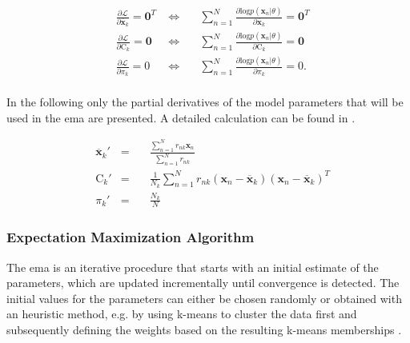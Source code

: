 \documentclass[../../../main.tex]{subfiles}
\begin{document}
\begin{equation*}
    \begin{aligned}
    &\frac{\partial{\mathcal{L}}}{\partial{\overline{\bm{x}}_k}} = \bm{0}^T \; &\Longleftrightarrow \quad &\sum\limits_{n=1}^N\frac{\partial{\mathrm{log}p(\bm{x}_n| \theta)}}{\partial{\overline{\bm{x}}_k}} = \bm{0}^T\\[5pt]
    &\frac{\partial{\mathcal{L}}}{\partial{\bm{\mathrm{C}}_k}} = \bm{0} \; &\Longleftrightarrow \quad &\sum\limits_{n=1}^N\frac{\partial{\mathrm{log}p(\bm{x}_n| \theta)}}{\partial{\bm{\mathrm{C}}_k}} = \bm{0}\\[5pt]
    &\frac{\partial{\mathcal{L}}}{\partial{\pi_k}} = 0 \; &\Longleftrightarrow \quad &\sum\limits_{n=1}^N\frac{\partial{\mathrm{log}p(\bm{x}_n| \theta)}}{\partial{\pi_k}} = 0.\\
    \end{aligned}
\end{equation*}

In the following only the partial derivatives of the model parameters that will be used in the \acrshort{ema} are presented. A detailed calculation can be found in \cite[pp.319]{dei_2020}.

\begin{equation}\label{eq:ml_estimator}
    \begin{aligned}
    &\overline{\bm{x}}_k' &= \quad &\frac{\sum_{n=1}^N r_{nk}\bm{x}_n}{\sum_{n=1}^N r_{nk}} \\
    &\bm{\mathrm{C}}_k' &= \quad &\frac{1}{N_k}\sum\limits_{n=1}^N r_{nk}(\bm{x}_n-\overline{\bm{x}}_k)(\bm{x}_n-\overline{\bm{x}}_k)^T\\
    &\pi_k' &= \quad &\frac{N_k}{N}
    \end{aligned}
\end{equation}

\subsubsection{Expectation Maximization Algorithm} \label{ch:Expectation_Maximization_Algorithm}

The \acrshort{ema} is an iterative procedure that starts with an initial estimate of the parameters, which are updated incrementally until convergence is detected. The initial values for the parameters can either be chosen randomly or obtained with an heuristic method, e.g. by using k-means to cluster the data first and subsequently defining the weights based on the resulting k-means memberships \cite[pp. 325]{dei_2020}. 
\end{document}
